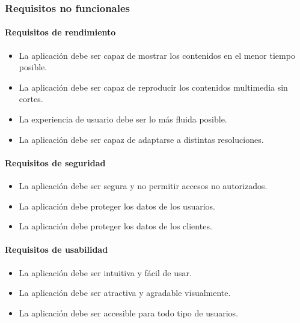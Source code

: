 \subsubsection{Requisitos no funcionales}
\label{subsubsec:analisis_requisitos_no_funcionales}

\paragraph{Requisitos de rendimiento}
\label{par:analisis_requisitos_no_funcionales_rendimiento}

\begin{itemize}
    \item La aplicación debe ser capaz de mostrar los contenidos en el menor tiempo posible.
    \item La aplicación debe ser capaz de reproducir los contenidos multimedia sin cortes.
    \item La experiencia de usuario debe ser lo más fluida posible.
    \item La aplicación debe ser capaz de adaptarse a distintas resoluciones.
\end{itemize}

\paragraph{Requisitos de seguridad}
\label{par:analisis_requisitos_no_funcionales_seguridad}

\begin{itemize}
    \item La aplicación debe ser segura y no permitir accesos no autorizados.
    \item La aplicación debe proteger los datos de los usuarios.
    \item La aplicación debe proteger los datos de los clientes.
\end{itemize}

\paragraph{Requisitos de usabilidad}
\label{par:analisis_requisitos_no_funcionales_usabilidad}

\begin{itemize}
    \item La aplicación debe ser intuitiva y fácil de usar.
    \item La aplicación debe ser atractiva y agradable visualmente.
    \item La aplicación debe ser accesible para todo tipo de usuarios.
\end{itemize}

